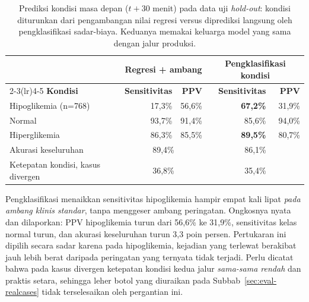 \begin{table}[htbp]
\centering
\caption{Prediksi kondisi masa depan ($t+30$ menit) pada data uji \emph{hold-out}: kondisi diturunkan dari pengambangan nilai regresi versus diprediksi langsung oleh pengklasifikasi sadar-biaya. Keduanya memakai keluarga model yang sama dengan jalur produksi.}
\label{tab:classifier}
\small
\begin{tabular}{@{}lrrrr@{}}
\toprule
& \multicolumn{2}{c}{\textbf{Regresi + ambang}} & \multicolumn{2}{c}{\textbf{Pengklasifikasi kondisi}} \\
\cmidrule(lr){2-3}\cmidrule(lr){4-5}
\textbf{Kondisi} & \textbf{Sensitivitas} & \textbf{PPV} & \textbf{Sensitivitas} & \textbf{PPV} \\
\midrule
Hipoglikemia (n=768) & 17,3\% & 56,6\% & \textbf{67,2\%} & 31,9\% \\
Normal & 93,7\% & 91,4\% & 85,6\% & 94,0\% \\
Hiperglikemia & 86,3\% & 85,5\% & \textbf{89,5\%} & 80,7\% \\
\midrule
Akurasi keseluruhan & \multicolumn{2}{c}{89,4\%} & \multicolumn{2}{c}{86,1\%} \\
Ketepatan kondisi, kasus divergen & \multicolumn{2}{c}{36,8\%} & \multicolumn{2}{c}{35,4\%} \\
\bottomrule
\end{tabular}

\vspace{0.4em}
{\footnotesize Pengklasifikasi menaikkan sensitivitas hipoglikemia hampir empat kali lipat \emph{pada ambang klinis standar}, tanpa menggeser ambang peringatan. Ongkosnya nyata dan dilaporkan: PPV hipoglikemia turun dari 56,6\% ke 31,9\%, sensitivitas kelas normal turun, dan akurasi keseluruhan turun 3,3 poin persen. Pertukaran ini dipilih secara sadar karena pada hipoglikemia, kejadian yang terlewat berakibat jauh lebih berat daripada peringatan yang ternyata tidak terjadi. Perlu dicatat bahwa pada kasus divergen ketepatan kondisi kedua jalur \emph{sama-sama rendah} dan praktis setara, sehingga leher botol yang diuraikan pada Subbab~\ref{sec:eval-realcases} tidak terselesaikan oleh pergantian ini.}
\end{table}
